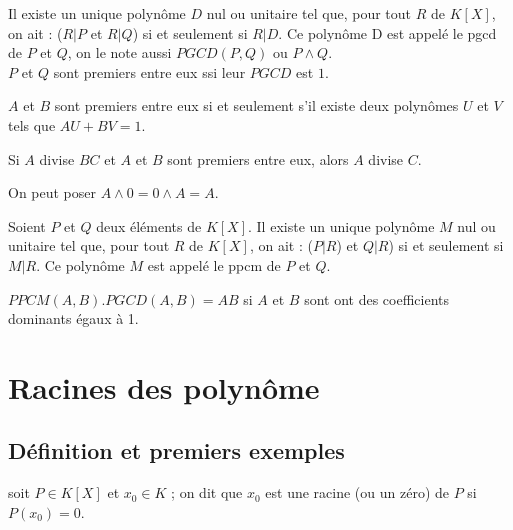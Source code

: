\documentclass[french]{book}
\begin{document}
\begin{defn}
Il existe un unique polynôme $D$ nul ou unitaire tel que, pour tout $R$ de $K[X]$, on ait :
($R\vert P$ et $R\vert Q$) si et seulement si $R\vert D$.
Ce polynôme D est appelé le pgcd de $P$ et $Q$, on le note aussi $PGCD(P,Q)$ ou $P\wedge Q$.\\

$P$ et $Q$ sont premiers entre eux ssi leur $PGCD$ est $1$.
\end{defn}

\begin{thm}

$A$ et $B$ sont premiers entre eux si et seulement s'il
existe deux polyn\^{o}mes $U$ et $V$ tels que $AU+BV=1.$

\end{thm}

\begin{cor}
Si $A$ divise $BC$ et $A$ et $B$ sont
premiers entre eux, alors $A$ divise $C$.
\end{cor}


\begin{rem}
On peut poser $A\wedge 0=0\wedge A=A.$
\end{rem}

\begin{defn}
Soient $P$ et $Q$ deux éléments de $K[X]$. Il existe un unique polynôme $M$ nul ou unitaire tel que, pour tout $R$ de $K[X]$, on ait :
($P \vert R$) et $Q\vert R$) si et seulement si $M \vert R$.
Ce polynôme $M$ est appelé le ppcm de $P$ et $Q$.
\end{defn}


\begin{defn}
$PPCM\left( A,B\right) .PGCD\left( A,B\right) =AB$ si $A$ et 
$B$ sont ont des coefficients dominants égaux à 1.
\vspace{5mm}
\end{defn}

\section{Racines des polynôme}


\subsection{D\'{e}finition et premiers exemples}

\begin{defn} soit $P\in K[X]$ et $x_{0}\in K$ ; on dit que $x_{0}$ est une racine
(ou un z\'{e}ro) de $P$ si $P\left( x_{0}\right) =0$.
\vspace{5mm}
\end{defn}
\end{document}
